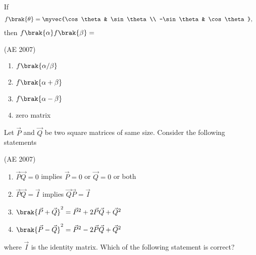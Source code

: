     \item If 
	    \begin{align*}
	    f\brak{\theta} = \myvec{\cos\theta & \sin\theta \\
        -\sin\theta & \cos\theta}, 
\end{align*}
then $f\brak{\alpha} f\brak{\beta} = $

\hfill (AE 2007)
    \begin{multicols}{4}
    \begin{enumerate}
        \item $f\brak{\alpha/\beta}$ 
        \item $f\brak{\alpha + \beta}$ 
        \item $f\brak{\alpha - \beta}$ 
        \item  zero matrix
    \end{enumerate}
    \end{multicols}
%
    \item Let $\vec{P}$ and $\vec{Q}$ be two square matrices of same size. Consider the following statements

\hfill (AE 2007)
\begin{enumerate}[label=(\roman*)]
	    \item $\vec{P}\vec{Q} = 0$ implies $\vec{P} = 0$ or $\vec{Q} = 0$ or both
        \item $\vec{P}\vec{Q} = \vec{I}$ implies $\vec{Q}\vec{P} = \vec{I}$
        \item $\brak{\vec{P} + \vec{Q}}^2 = \vec{P}^2 + 2\vec{P}\vec{Q} + \vec{Q}^2$
	\item $\brak{\vec{P} - \vec{Q}}^2 = \vec{P}^2 - 2\vec{P}\vec{Q} + \vec{Q}^2$
    \end{enumerate}
    where $\vec{I}$ is the identity matrix. Which of the following statement is correct? 

